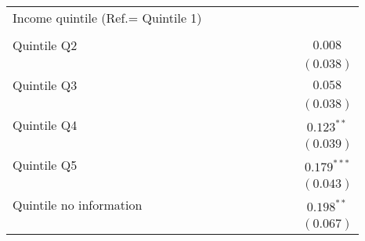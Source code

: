 \documentclass[
  12pt,
]{article}
\begin{document}
\begin{table}
\begin{center}
{\begin{tabular}{l c c c c c c c c}
Income quintile (Ref.= Quintile 1)                    &               &                &                &                &                &                &                &                \\
                                                      &               &                &                &                &                &                &                &                \\
\quad Quintile Q2                                     &               &                &                &                &                &                &                & $0.008$        \\
                                                      &               &                &                &                &                &                &                & $(0.038)$      \\
\quad Quintile Q3                                     &               &                &                &                &                &                &                & $0.058$        \\
                                                      &               &                &                &                &                &                &                & $(0.038)$      \\
\quad Quintile Q4                                     &               &                &                &                &                &                &                & $0.123^{**}$   \\
                                                      &               &                &                &                &                &                &                & $(0.039)$      \\
\quad Quintile Q5                                     &               &                &                &                &                &                &                & $0.179^{***}$  \\
                                                      &               &                &                &                &                &                &                & $(0.043)$      \\
\quad Quintile no information                         &               &                &                &                &                &                &                & $0.198^{**}$   \\
                                                      &               &                &                &                &                &                &                & $(0.067)$      \\

\end{tabular}}
\end{center}
\end{table}
\end{document}

